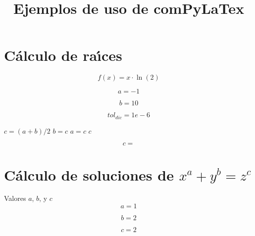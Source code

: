 \documentclass{article}
\title{Ejemplos de uso de comPyLaTex}
\author{}
\date{}
\begin{document}
\maketitle


\section{C\'alculo de ra\'{\i}ces}

\begin{equation}
f(x) = x \cdot \ln(2)
\label{eq:calc:f}
\end{equation}

\begin{equation}
a = -1
\label{eq:calc:a}
\end{equation}

\begin{equation}
b = 10
\label{eq:calc:b}
\end{equation}

\begin{equation}
    tol_{dic} = 1e-6
    \label{eq:calc:toldic}
\end{equation}

\begin{algorithm}
\caption{M\'etodo de dicotom\'{\i}a}
\label{alg:calc:dicotomia}
\begin{algorithmic}
    \STATE $c = (a + b)/2$
        \STATE $b = c$
    \ELSE
        \STATE $a = c$
    \ENDIF
\ENDWHILE
\RETURN $c$
\end{algorithmic}
\end{algorithm}

\begin{equation}
    c = 
    \label{eq:res:c}
\end{equation}

\section{C\'alculo de soluciones de $x^a + y^b = z^c$}

Valores $a$, $b$, y $c$
\begin{equation}
a = 1
\label{eq:calc:a}
\end{equation}

\begin{equation}
b = 2
\label{eq:calc:b}
\end{equation}

\begin{equation}
c = 2
\label{eq:calc:c}
\end{equation}
\end{document}
